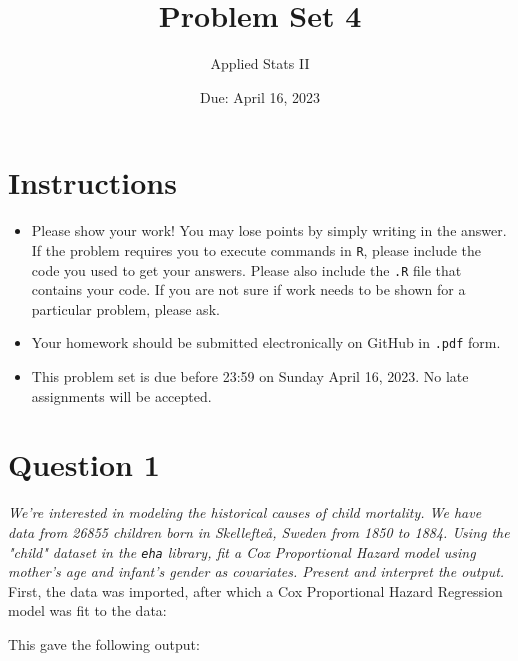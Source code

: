 \documentclass[12pt,letterpaper]{article}
\title{Problem Set 4}
\date{Due: April 16, 2023}
\author{Applied Stats II}
\begin{document}
	\maketitle
	\section*{Instructions}
	\begin{itemize}
	\item Please show your work! You may lose points by simply writing in the answer. If the problem requires you to execute commands in \texttt{R}, please include the code you used to get your answers. Please also include the \texttt{.R} file that contains your code. If you are not sure if work needs to be shown for a particular problem, please ask.
	\item Your homework should be submitted electronically on GitHub in \texttt{.pdf} form.
	\item This problem set is due before 23:59 on Sunday April 16, 2023. No late assignments will be accepted.

	\end{itemize}

	\vspace{.25cm}
\section*{Question 1}
\vspace{.25cm}
\noindent \textit{We're interested in modeling the historical causes of child mortality. We have data from 26855 children born in Skellefteå, Sweden from 1850 to 1884. Using the "child" dataset in the \texttt{eha} library, fit a Cox Proportional Hazard model using mother's age and infant's gender as covariates. Present and interpret the output.} \\

\noindent First, the data was imported, after which a Cox Proportional Hazard Regression model was fit to the data:

 

\noindent This gave the following output:
\end{document}
